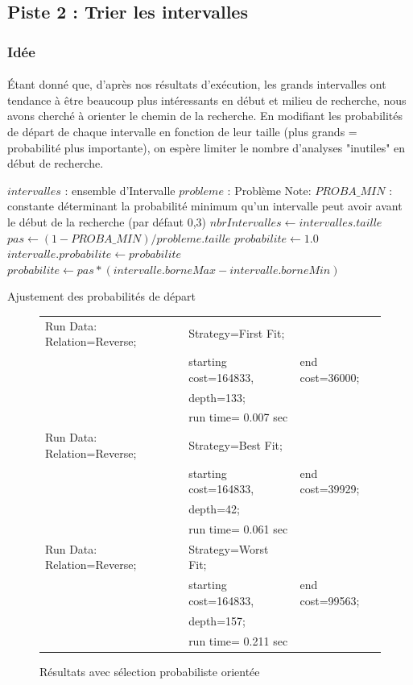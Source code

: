 \documentclass[a4paper,10pt]{report}
\begin{document}
\subsection{Piste 2 : Trier les intervalles}
\subsubsection{Idée}

\paragraph{}
  Étant donné que, d'après nos résultats d'exécution, les grands intervalles ont
tendance à être beaucoup plus intéressants en début et milieu de recherche, nous
avons cherché à orienter le chemin de la recherche. En modifiant les
probabilités de départ de chaque intervalle en fonction de leur taille (plus
grands = probabilité plus importante), on espère limiter le nombre d'analyses
"inutiles" en début de recherche.


\begin{algorithm}
  \begin{algorithmic}
    \Require $intervalles$ : ensemble d'Intervalle
    \Require $probleme$ : Problème
    \State 
    \Comment Note: $PROBA\_MIN$ : constante déterminant la probabilité minimum
qu'un
intervalle peut avoir avant le début de la recherche (par défaut 0,3)
    \State
    \State $nbrIntervalles \gets intervalles.taille$
    \State $pas \gets (1 - PROBA\_MIN) / probleme.taille$
    \State $probabilite \gets 1.0$
      \State $intervalle.probabilite \gets probabilite$
      \State $probabilite \gets pas * (intervalle.borneMax -
intervalle.borneMin)$
    \EndFor
  \end{algorithmic}
  \caption{Ajustement des probabilités de départ}
\end{algorithm}


\begin{figure}[h]
 \begin{tabular}{lll}
  Run Data: Relation=Reverse;&
    Strategy=First Fit;\\
    &starting cost=164833,&
    end cost=36000;\\
    &depth=133;\\
    &run time= 0.007 sec\\
  Run Data: Relation=Reverse;&
    Strategy=Best Fit;\\
    &starting cost=164833,&
    end cost=39929;\\
    &depth=42;\\
    &run time= 0.061 sec\\
  Run Data: Relation=Reverse;&
    Strategy=Worst Fit;\\
    &starting cost=164833,&
    end cost=99563;\\
    &depth=157;\\
    &run time= 0.211 sec\\
 \end{tabular}
 \caption{Résultats avec sélection probabiliste orientée}
\end{figure}
\end{document}
